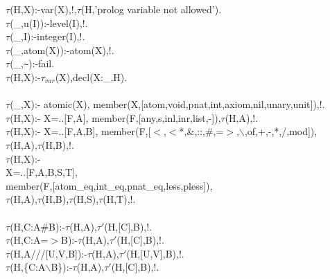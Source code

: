 \documentclass[11pt]{report}
\makeatletter
\newcommand{\ulinv}[1]{\index{#1@\texttt{#1}}}
\makeatother
\begin{document}
 \ulinv{ttt}
\begin{sf}\begin{tabbing}
$\tau$(H,X):-var(X),!,$\tau$(H,'prolog variable not allowed').\\[-0.15ex]
$\tau$(\_\hspace{0.1em},u(I)):-level(I),!.\\[-0.15ex]
$\tau$(\_\hspace{0.1em},I):-integer(I),!.\\[-0.15ex]
$\tau$(\_\hspace{0.1em},atom(X)):-atom(X),!.\\[-0.15ex]
$\tau$(\_\hspace{0.1em},{\verb`~`}):-fail.\\[-0.15ex]
$\tau$(H,X):-$\tau_{var}$(X),decl(X:\_\hspace{0.1em},H).\\[-0.7ex]
\\[-0.15ex]
$\tau$(\_\hspace{0.1em},X):- atomic(X), member(X,[atom,void,pnat,int,axiom,nil,unary,unit]),!.\\[-0.15ex]
$\tau$(H,X):- X=..[F,A], member(F,[any,s,inl,inr,list,-]),$\tau$(H,A),!.\\[-0.15ex]
$\tau$(H,X):- X=..[F,A,B], member(F,[$<$,$<$*,\&,::,\#,=$>$,$\backslash$,of,+,-,*,/,mod]),\\[-0.15ex]
\hspace{3em}$\tau$(H,A),$\tau$(H,B),!.\\[-0.15ex]
$\tau$(H,X):- \\[-0.15ex]
\hspace{2em}X=..[F,A,B,S,T], \\[-0.15ex]
\hspace{2em}member(F,[atom\_\hspace{0.1em}eq,int\_\hspace{0.1em}eq,pnat\_\hspace{0.1em}eq,less,pless]), \\[-0.15ex]
\hspace{2em}$\tau$(H,A),$\tau$(H,B),$\tau$(H,S),$\tau$(H,T),!.\\[-0.7ex]
\\[-0.15ex]
$\tau$(H,C:A\#B):-$\tau$(H,A),$\tau'$(H,[C],B),!.\\[-0.15ex]
$\tau$(H,C:A=$>$B):-$\tau$(H,A),$\tau'$(H,[C],B),!.\\[-0.15ex]
$\tau$(H,A///[U,V,B]):-$\tau$(H,A),$\tau'$(H,[U,V],B),!.\\[-0.15ex]
$\tau$(H,\{C:A$\backslash$B\}):-$\tau$(H,A),$\tau'$(H,[C],B),!.\\[-0.15ex]

\end{tabbing}
\end{sf}
\end{document}
